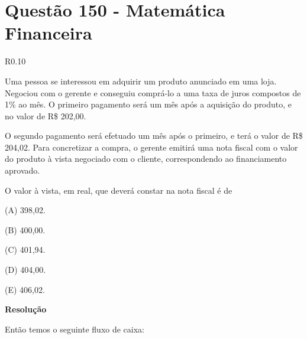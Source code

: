 \section{Questão 150 - Matemática Financeira}

\begin{wrapfigure}{R}{0.10\textwidth}
    \begin{center}
        \href{https://youtu.be/S22SHYt4n-o}{
        }
    \end{center}
\end{wrapfigure}

Uma pessoa se interessou em adquirir um produto anunciado em uma loja. Negociou com o gerente e conseguiu comprá-lo a uma taxa de juros compostos de 1\% ao mês. O primeiro pagamento será um mês após a aquisição do produto, e no valor de R\$ 202,00.

O segundo pagamento será efetuado um mês após o primeiro, e terá o valor de R\$ 204,02. Para concretizar a compra, o gerente emitirá uma nota fiscal com o valor do produto à vista negociado com o cliente, correspondendo ao financiamento aprovado.

O valor à vista, em real, que deverá constar na nota fiscal é de

(A) 398,02.

(B) 400,00.

(C) 401,94.

(D) 404,00.

(E) 406,02.

\textbf{Resolução}

Então temos o seguinte fluxo de caixa:

